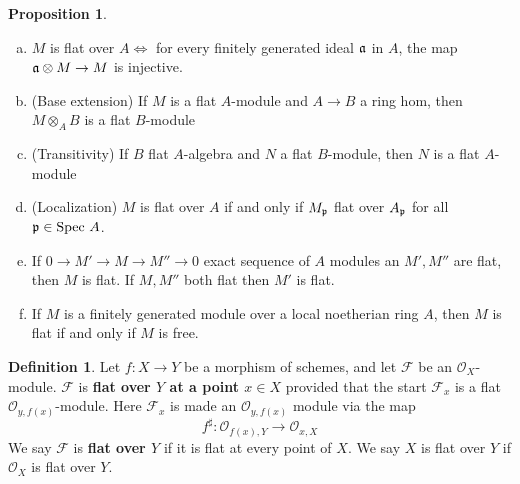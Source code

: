 \documentclass[10pt,reqno]{amsart}
\theoremstyle{definition}
\newtheorem{definition}[theorem]{Definition}
\newtheorem{proposition}[theorem]{Proposition}
\theoremstyle{remark}
\numberwithin{equation}{section}
\numberwithin{theorem}{section}
\newcommand{\OO}{{\mathcal O}}
\newcommand{\spec}{\textup{Spec }}
\newcommand{\FF}{{\mathscr F}}
\newcommand{\pp}{\frak{p}}
\begin{document}
\begin{proposition} \textup{ }
\begin{enumerate}[(a)]
\item $M$ is flat over $A \iff$ for every finitely generated ideal $\frak{a}$ in $A$, the map $\frak{a} \otimes M \to M$ is injective.
\item (Base extension) If $M$ is a flat $A$-module and $A \to B$ a ring hom, then $M \otimes_A B$ is a flat $B$-module
\item (Transitivity) If $B$ flat $A$-algebra and $N$ a flat $B$-module, then $N$ is a flat $A$-module
\item (Localization) $M$ is flat over $A$ if and only if $M_{\pp}$ flat over $A_{\pp}$ for all $\pp \in \spec A$.
\item If $0 \to M' \to M \to M'' \to 0$ exact sequence of $A$ modules an $M',M''$ are flat, then $M$ is flat. If $M, M''$ both flat then $M'$ is flat.
\item If $M$ is a finitely generated module over a local noetherian ring $A$, then $M$ is flat if and only if $M$ is free.
\end{enumerate}
\end{proposition}

\begin{definition} Let $f: X \to Y$ be a morphism of schemes, and let $\FF$ be an $\OO_X$-module. $\FF$ is \textbf{flat over $Y$ at a point $x \in X$} provided that the start $\FF_x$ is a flat $\OO_{y,f(x)}$-module. Here $\FF_x$ is made an $\OO_{y,f(x)}$ module via the map
\[f^{\sharp}:\OO_{f(x),Y} \to \OO_{x,X}\]
We say $\FF$ is \textbf{flat over $Y$} if it is flat at every point of $X$. We say $X$ is flat over $Y$ if $\OO_X$ is flat over $Y$.
\end{definition}
\end{document}
